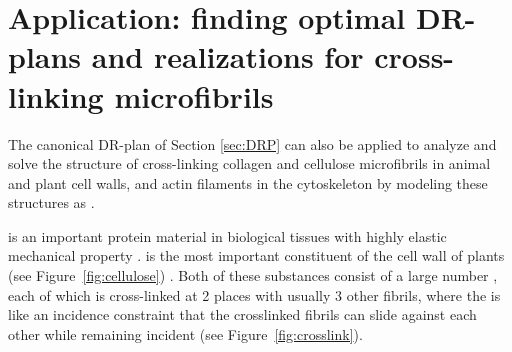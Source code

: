\section{Application: finding optimal DR-plans and realizations for cross-linking microfibrils }
\label{sec:pinnedline}

The canonical DR-plan of Section \ref{sec:DRP} can also be applied to analyze and solve the structure of  cross-linking collagen and cellulose microfibrils in animal and plant cell walls, and actin filaments in the cytoskeleton by modeling these structures as .


 is an important protein material in biological tissues with highly elastic mechanical property \cite{buehler2008nanomechanics}.  is the most important constituent of the cell wall of plants (see Figure~\ref{fig:cellulose}) \cite{fall2013physical,smith1971plant}. Both of these substances consist of a large number ,
each of which is cross-linked at 2 places with usually 3 other fibrils, where the  is like an incidence constraint that the crosslinked fibrils can slide against each other while remaining incident (see Figure~\ref{fig:crosslink}).

%
%
%
%
%
%





